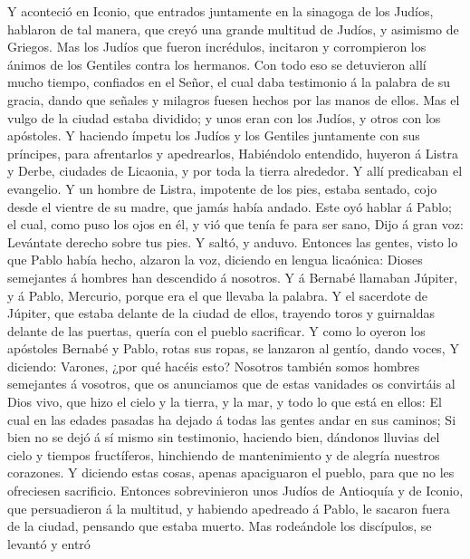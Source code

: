  Y aconteció en Iconio, que entrados juntamente en la
sinagoga de los Judíos, hablaron de tal manera, que creyó una grande
multitud de Judíos, y asimismo de Griegos.  Mas los Judíos
que fueron incrédulos, incitaron y corrompieron los ánimos de los
Gentiles contra los hermanos.  Con todo eso se detuvieron
allí mucho tiempo, confiados en el Señor, el cual daba testimonio á la
palabra de su gracia, dando que señales y milagros fuesen hechos por las
manos de ellos.  Mas el vulgo de la ciudad estaba dividido;
y unos eran con los Judíos, y otros con los apóstoles.  Y
haciendo ímpetu los Judíos y los Gentiles juntamente con sus príncipes,
para afrentarlos y apedrearlos,  Habiéndolo entendido,
huyeron á Listra y Derbe, ciudades de Licaonia, y por toda la tierra
alrededor.  Y allí predicaban el evangelio.  Y
un hombre de Listra, impotente de los pies, estaba sentado, cojo desde
el vientre de su madre, que jamás había andado.  Este oyó
hablar á Pablo; el cual, como puso los ojos en él, y vió que tenía fe
para ser sano,  Dijo á gran voz: Levántate derecho sobre
tus pies. Y saltó, y anduvo.  Entonces las gentes, visto lo
que Pablo había hecho, alzaron la voz, diciendo en lengua licaónica:
Dioses semejantes á hombres han descendido á nosotros.  Y á
Bernabé llamaban Júpiter, y á Pablo, Mercurio, porque era el que llevaba
la palabra.  Y el sacerdote de Júpiter, que estaba delante
de la ciudad de ellos, trayendo toros y guirnaldas delante de las
puertas, quería con el pueblo sacrificar.  Y como lo oyeron
los apóstoles Bernabé y Pablo, rotas sus ropas, se lanzaron al gentío,
dando voces,  Y diciendo: Varones, ¿por qué hacéis esto?
Nosotros también somos hombres semejantes á vosotros, que os anunciamos
que de estas vanidades os convirtáis al Dios vivo, que hizo el cielo y
la tierra, y la mar, y todo lo que está en ellos:  El cual
en las edades pasadas ha dejado á todas las gentes andar en sus caminos;
 Si bien no se dejó á sí mismo sin testimonio, haciendo
bien, dándonos lluvias del cielo y tiempos fructíferos, hinchiendo de
mantenimiento y de alegría nuestros corazones.  Y diciendo
estas cosas, apenas apaciguaron el pueblo, para que no les ofreciesen
sacrificio.  Entonces sobrevinieron unos Judíos de
Antioquía y de Iconio, que persuadieron á la multitud, y habiendo
apedreado á Pablo, le sacaron fuera de la ciudad, pensando que estaba
muerto.  Mas rodeándole los discípulos, se levantó y entró

